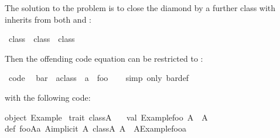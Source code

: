 \begin{isabellebody}
\begin{isamarkuptext}
  The solution to the problem is to close the diamond by a further
  class with inherits from both  and :%
\end{isamarkuptext}%
\isamarkuptrue%
%
\isadelimquote
%
\endisadelimquote
%
\isatagquote
{}\isamarkupfalse%
\ class{}\ {}\ class{}\ {}\ class{}%
\endisatagquote
{\isafoldquote}%
%
\isadelimquote
%
\endisadelimquote
%
\begin{isamarkuptext}%
\noindent Then the offending code equation can be restricted to
  :%
\end{isamarkuptext}%
\isamarkuptrue%
%
\isadelimquote
%
\endisadelimquote
%
\isatagquote
{}\isamarkupfalse%
\ {}code{}{}\isanewline
\ \ {}{}bar\ {}{}\ {}a{}{}class{}\ {}\ {}a{}\ {}\ foo{}\isanewline
\ \ \isamarkupfalse%
\ {}simp\ only{}\ bar{}def{}%
\endisatagquote
{\isafoldquote}%
%
\isadelimquote
%
\endisadelimquote
%
\begin{isamarkuptext}%
\noindent with the following code:%
\end{isamarkuptext}%
\isamarkuptrue%
%
\isadelimquotetypewriter
%
\endisadelimquotetypewriter
%
\isatagquotetypewriter
%
\begin{isamarkuptext}%
object\ Example\ {}\isanewline
\isanewline
trait\ class{}{}A{}\ {}\isanewline
\ \ val\ {}Example{}foo{}{}\ A\ {}{}\ A\isanewline
{}\isanewline
def\ foo{}A{}{}a{}\ A{}{}implicit\ A{}\ class{}{}A{}{}{}\ A\ {}\ A{}{}Example{}foo{}{}a{}\isanewline

\end{isamarkuptext}
\end{isabellebody}
